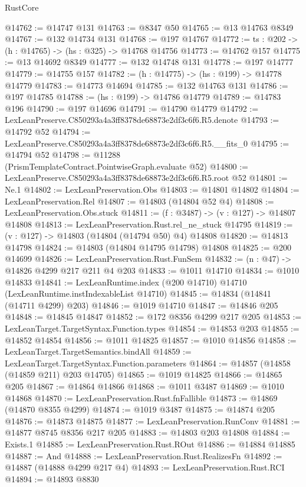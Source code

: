 \begin{lexlean}{RustCore}
\begin{coremodule}
@14762 := @14747 @131
@14763 := @8347 @50
@14765 := @13 @14763 @8349
@14767 := @132 @14734 @131
@14768 := @197 @14767
@14772 := {ts : @202} -> (h : @14765) -> (hs : @325) -> @14768 @14756
@14773 := @14762 @157
@14775 := @13 @14692 @8349
@14777 := @132 @14748 @131
@14778 := @197 @14777
@14779 := @14755 @157
@14782 := (h : @14775) -> (hs : @199) -> @14778 @14779
@14783 := @14773 @14694
@14785 := @132 @14763 @131
@14786 := @197 @14785
@14788 := (hs : @199) -> @14786 @14779
@14789 := @14783 @196
@14790 := @197 @14696
@14791 := @14790 @14779
@14792 := LexLeanPreserve.C850293a4a3ff8378de68873e2df3c6f6.R5.denote
@14793 := @14792 @52
@14794 := LexLeanPreserve.C850293a4a3ff8378de68873e2df3c6f6.R5.__fits_0
@14795 := @14794 @52
@14798 := @11288 (PrismTemplateContract.PointwiseGraph.evaluate @52)
@14800 := LexLeanPreserve.C850293a4a3ff8378de68873e2df3c6f6.R5.root @52
@14801 := Ne.{1}
@14802 := LexLeanPreservation.Obs
@14803 := @14801 @14802
@14804 := LexLeanPreservation.Rel
@14807 := @14803 (@14804 @52 @4)
@14808 := LexLeanPreservation.Obs.stuck
@14811 := (f : @3487) -> (v : @127) -> @14807 @14808
@14813 := LexLeanPreservation.Rust.rel_ne_stuck @14795
@14819 := (v : @127) -> @14803 (@14804 (@14794 @50) @4) @14808
@14820 := @14813 @14798
@14824 := @14803 (@14804 @14795 @14798) @14808
@14825 := @200 @14699
@14826 := LexLeanPreservation.Rust.FunSem
@14832 := (n : @47) -> @14826 @4299 @217 @211 @4 @203
@14833 := @1011 @14710
@14834 := @1010 @14833
@14841 := LexLeanRuntime.index (@200 @14710) @14710 (LexLeanRuntime.instIndexableList @14710)
@14845 := @14834 (@14841 (@14711 @4299) @203)
@14846 := @1019 @14710
@14847 := @14846 @205
@14848 := @14845 @14847
@14852 := @172 @8356 @4299 @217 @205
@14853 := LexLeanTarget.TargetSyntax.Function.types
@14854 := @14853 @203
@14855 := @14852 @14854
@14856 := @1011 @14825
@14857 := @1010 @14856
@14858 := LexLeanTarget.TargetSemantics.bindAll
@14859 := LexLeanTarget.TargetSyntax.Function.parameters
@14864 := @14857 (@14858 (@14859 @211) @203 @14705)
@14865 := @1019 @14825
@14866 := @14865 @205
@14867 := @14864 @14866
@14868 := @1011 @3487
@14869 := @1010 @14868
@14870 := LexLeanPreservation.Rust.fnFallible
@14873 := @14869 (@14870 @8355 @4299)
@14874 := @1019 @3487
@14875 := @14874 @205
@14876 := @14873 @14875
@14877 := LexLeanPreservation.RunConv
@14881 := @14877 @8745 @8356 @217 @205
@14883 := @14803 @203 @14808
@14884 := Exists.{1}
@14885 := LexLeanPreservation.Rust.ROut
@14886 := @14884 @14885
@14887 := And
@14888 := LexLeanPreservation.Rust.RealizesFn
@14892 := @14887 (@14888 @4299 @217 @4)
@14893 := LexLeanPreservation.Rust.RCI
@14894 := @14893 @8830

\end{coremodule}
\end{lexlean}
